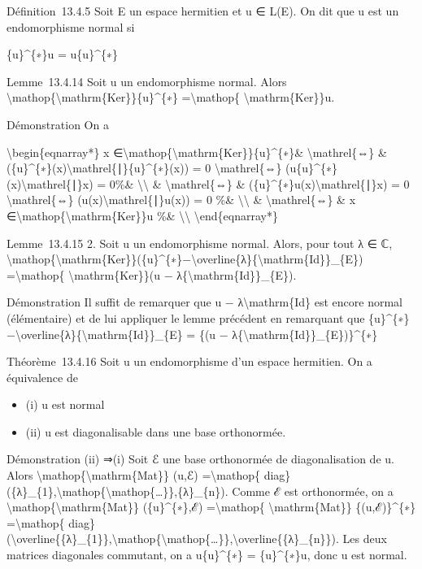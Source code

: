 \documentclass[]{article}
\begin{document}
Définition~13.4.5 Soit E un espace hermitien et u ∈ L(E). On dit que u
est un endomorphisme normal si

\{u\}\^{}\{∗\}u = u\{u\}\^{}\{∗\}

Lemme~13.4.14 Soit u un endomorphisme normal. Alors
\textbackslash{}mathop\{\textbackslash{}mathrm\{Ker\}\}\{u\}\^{}\{∗\}
=\textbackslash{}mathop\{ \textbackslash{}mathrm\{Ker\}\}u.

Démonstration On a

\textbackslash{}begin\{eqnarray*\} x
∈\textbackslash{}mathop\{\textbackslash{}mathrm\{Ker\}\}\{u\}\^{}\{∗\}\&
\textbackslash{}mathrel\{⇔\} \&
(\{u\}\^{}\{∗\}(x)\textbackslash{}mathrel\{∣\}\{u\}\^{}\{∗\}(x)) = 0
\textbackslash{}mathrel\{⇔\}
(u\{u\}\^{}\{∗\}(x)\textbackslash{}mathrel\{∣\}x) = 0\%\&
\textbackslash{}\textbackslash{} \& \textbackslash{}mathrel\{⇔\} \&
(\{u\}\^{}\{∗\}u(x)\textbackslash{}mathrel\{∣\}x) = 0
\textbackslash{}mathrel\{⇔\} (u(x)\textbackslash{}mathrel\{∣\}u(x)) = 0
\%\& \textbackslash{}\textbackslash{} \& \textbackslash{}mathrel\{⇔\} \&
x ∈\textbackslash{}mathop\{\textbackslash{}mathrm\{Ker\}\}u \%\&
\textbackslash{}\textbackslash{} \textbackslash{}end\{eqnarray*\}

Lemme~13.4.15 2. Soit u un endomorphisme normal. Alors, pour tout λ ∈ ℂ,
\textbackslash{}mathop\{\textbackslash{}mathrm\{Ker\}\}(\{u\}\^{}\{∗\}−\textbackslash{}overline\{λ\}\{\textbackslash{}mathrm\{Id\}\}\_\{E\})
=\textbackslash{}mathop\{ \textbackslash{}mathrm\{Ker\}\}(u −
λ\{\textbackslash{}mathrm\{Id\}\}\_\{E\}).

Démonstration Il suffit de remarquer que u −
λ\textbackslash{}mathrm\{Id\} est encore normal (élémentaire) et de lui
appliquer le lemme précédent en remarquant que
\{u\}\^{}\{∗\}−\textbackslash{}overline\{λ\}\{\textbackslash{}mathrm\{Id\}\}\_\{E\}
= \{(u − λ\{\textbackslash{}mathrm\{Id\}\}\_\{E\})\}\^{}\{∗\}

Théorème~13.4.16 Soit u un endomorphisme d'un espace hermitien. On a
équivalence de

\begin{itemize}
\itemsep1pt\parskip0pt
\item
  (i) u est normal
\item
  (ii) u est diagonalisable dans une base orthonormée.
\end{itemize}

Démonstration (ii) ⇒(i) Soit ℰ une base orthonormée de diagonalisation
de u. Alors \textbackslash{}mathop\{\textbackslash{}mathrm\{Mat\}\}
(u,ℰ) =\textbackslash{}mathop\{
diag\}(\{λ\}\_\{1\},\textbackslash{}mathop\{\textbackslash{}mathop\{\ldots{}\}\},\{λ\}\_\{n\}).
Comme ℰ est orthonormée, on a
\textbackslash{}mathop\{\textbackslash{}mathrm\{Mat\}\}
(\{u\}\^{}\{∗\},ℰ) =\textbackslash{}mathop\{
\textbackslash{}mathrm\{Mat\}\} \{(u,ℰ)\}\^{}\{∗\}
=\textbackslash{}mathop\{
diag\}(\textbackslash{}overline\{\{λ\}\_\{1\}\},\textbackslash{}mathop\{\textbackslash{}mathop\{\ldots{}\}\},\textbackslash{}overline\{\{λ\}\_\{n\}\}).
Les deux matrices diagonales commutant, on a u\{u\}\^{}\{∗\} =
\{u\}\^{}\{∗\}u, donc u est normal.
\end{document}
